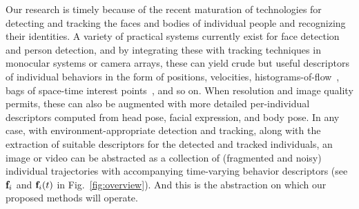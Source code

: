 Our research is timely because of the recent maturation of technologies for detecting and tracking the faces and bodies of individual people and recognizing their identities. A variety of practical systems currently exist for face detection and person detection, and by integrating these with tracking techniques in monocular systems or camera arrays, these can yield crude but useful descriptors of individual behaviors in the form of positions, velocities, histograms-of-flow~\cite{}, bags of space-time interest points~\cite{}, and so on. When resolution and image quality permits, these can also be augmented with more detailed per-individual descriptors computed from head pose, facial expression, and body pose. In any case, with environment-appropriate detection and tracking, along with the extraction of suitable descriptors for the detected and tracked individuals, an image or video can be abstracted as a collection of (fragmented and noisy) individual trajectories with accompanying time-varying behavior descriptors (see ${\bf f}_i$ and ${\bf f}_i(t)$ in Fig.~\ref{fig:overview}). And this is the abstraction on which our proposed methods will operate.

